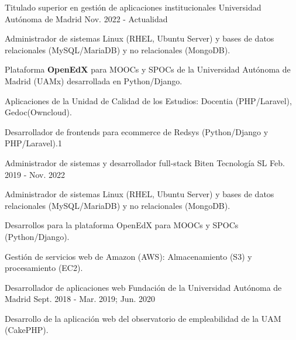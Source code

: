 

\begin{cventries}
  \cventry
    {Titulado superior en gestión de aplicaciones institucionales} %
    {Universidad Autónoma de Madrid} %
    {} %
    {Nov. 2022 - Actualidad} %
    {
      \begin{cvitems} %
        \item{Administrador de sistemas Linux (RHEL, Ubuntu Server) y bases de datos relacionales (MySQL/MariaDB) y no relacionales (MongoDB).}
		\item{Plataforma \textbf{OpenEdX} para MOOCs y SPOCs de la Universidad Autónoma de Madrid (UAMx) desarrollada en Python/Django.}
		\item{Aplicaciones de la Unidad de Calidad de los Estudios: Docentia (PHP/Laravel), Gedoc(Owncloud).}
		\item{Desarrollador de frontends para ecommerce de Redsys (Python/Django y PHP/Laravel).}1
      \end{cvitems}
    }

  \cventry
    {Administrador de sistemas y desarrollador full-stack} %
    {Biten Tecnología SL} %
    {} %
    {Feb. 2019 - Nov. 2022} %
    {
    \begin{cvitems}
      \item{Administrador de sistemas Linux (RHEL, Ubuntu Server) y bases de datos relacionales (MySQL/MariaDB) y no relacionales (MongoDB).}
		\item{Desarrollos para la plataforma OpenEdX para MOOCs y SPOCs (Python/Django).}
		\item{Gestión de servicios web de Amazon (AWS): Almacenamiento (S3) y procesamiento (EC2).}
	\end{cvitems}
	}

  \cventry
    {Desarrollador de aplicaciones web} %
    {Fundación de la Universidad Autónoma de Madrid} %
    {} %
    {Sept. 2018 - Mar. 2019; Jun. 2020} %
    {
      \begin{cvitems} %
        \item {Desarrollo de la aplicación web del observatorio de empleabilidad de la UAM (CakePHP).}
      \end{cvitems}
    }


\end{cventries}
